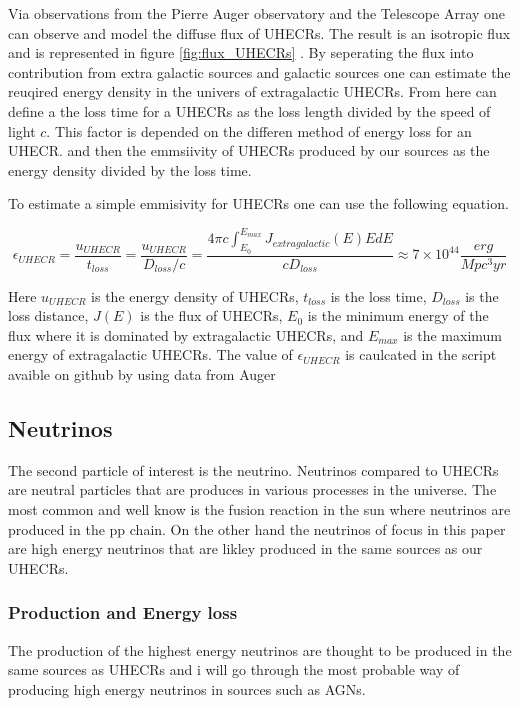 \documentclass{article}
\begin{document}
Via observations from the Pierre Auger observatory and the Telescope Array one can observe and model the diffuse flux of UHECRs. The result is an isotropic flux and is represented in figure \ref{fig:flux_UHECRs} .  By seperating the 
flux into contribution from extra galactic sources and galactic sources one can estimate the reuqired energy density in the univers of extragalactic UHECRs. From here can define a the loss time for a UHECRs as the loss length divided by the speed of light $c$. This factor is depended on the differen method of energy loss for an UHECR. and 
then the emmsiivity of UHECRs produced by our sources as the energy density divided by the loss time.

To estimate a simple emmisivity for UHECRs one can use the following equation.

\begin{equation}
    \epsilon_{UHECR} = \frac{u_{UHECR}}{t_{loss}} = \frac{u_{UHECR}}{D_{loss}/c} = \frac{4\pi c \int_{E_0}^{E_{max}}J_{extragalactic}(E)E dE}{c D_{loss}} \approx 7\times 10^{44} \frac{erg}{Mpc^3 yr}
\end{equation}

Here $u_{UHECR}$ is the energy density of UHECRs, $t_{loss}$ is the loss time, $D_{loss}$ is the loss distance, $J(E)$ is the flux of UHECRs, $E_0$ is the minimum energy of the flux where it is dominated by extragalactic UHECRs, and $E_{max}$ is the maximum energy of extragalactic UHECRs.
The value of $\epsilon_{UHECR}$ is caulcated in the script avaible on github by using data from  Auger \cite{thepierreaugercollaboration2017pierre}


\subsection{Neutrinos}

The second particle of interest is the neutrino. Neutrinos compared to UHECRs are neutral particles that are produces in various processes in the universe.
The most common and well know is the fusion reaction in the sun where neutrinos are produced in the pp chain. On the other hand the neutrinos of focus in this paper 
are high energy neutrinos that are likley produced in the same sources as our UHECRs.



\subsubsection{Production and Energy loss}
The production of the highest energy neutrinos are thought to be produced in the same sources as UHECRs 
and i will go through the most probable way of producing high energy neutrinos in sources such as AGNs.
\end{document}
